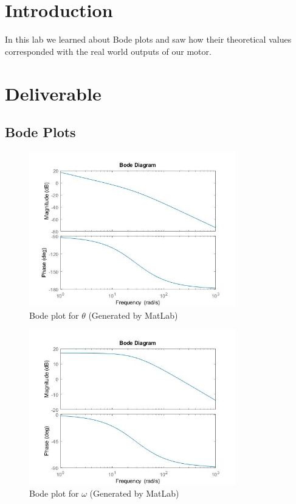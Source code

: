 
\section{Introduction}
In this lab we learned about Bode plots and saw how their theoretical values corresponded with the real world outputs of our motor. 

\section{Deliverable}
\subsection{Bode Plots}
\begin{figure}[H]
	\centering
	\includegraphics[width=0.8\textwidth]{./figures/lab2_theta.jpg}
	\caption{Bode plot for $\theta$ (Generated by MatLab)}
	\label{fig:}
\end{figure}

\begin{figure}[H]
	\centering
	\includegraphics[width=0.8\textwidth]{./figures/lab2_omega.jpg}
	\caption{Bode plot for $\omega$ (Generated by MatLab)}
	\label{fig:}
\end{figure}

